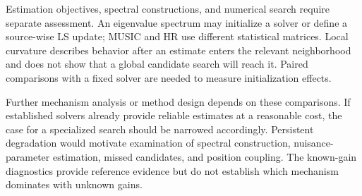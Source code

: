 Estimation objectives, spectral constructions, and numerical search require separate assessment. An eigenvalue spectrum may initialize a solver or define a source-wise LS update; MUSIC and HR use different statistical matrices. Local curvature describes behavior after an estimate enters the relevant neighborhood and does not show that a global candidate search will reach it. Paired comparisons with a fixed solver are needed to measure initialization effects.

Further mechanism analysis or method design depends on these comparisons. If established solvers already provide reliable estimates at a reasonable cost, the case for a specialized search should be narrowed accordingly. Persistent degradation would motivate examination of spectral construction, nuisance-parameter estimation, missed candidates, and position coupling. The known-gain diagnostics provide reference evidence but do not establish which mechanism dominates with unknown gains.
